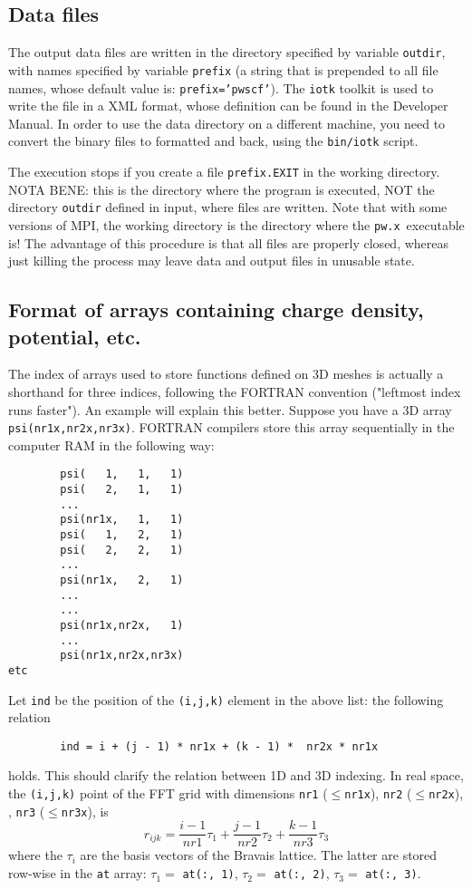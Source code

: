 \documentclass[12pt,a4paper]{article}
\def\pw.x{\texttt{pw.x}}
\begin{document}
\subsection{Data files}

The output data files are written in the directory specified by variable
\texttt{outdir}, with names specified by variable \texttt{prefix} (a string that is prepended
to all file names, whose default value is: \texttt{prefix='pwscf'}). The \texttt{iotk}
toolkit is used to write the file in a XML format, whose definition can
be found in the Developer Manual. In order to use the data directory
on a different machine, you need to convert the binary files to formatted
and back, using the \texttt{bin/iotk} script.

The execution stops if you create a file \texttt{prefix.EXIT} in the working 
directory. NOTA BENE: this is the directory where the program 
is executed, NOT the directory \texttt{outdir} defined in input, where files 
are written. Note that with some versions of MPI, the working directory 
is the directory where the \pw.x\ executable is! The advantage of this 
procedure is that all files are properly closed, whereas  just killing 
the process may leave data and output files in unusable state.

\subsection{Format of arrays containing charge density, potential, etc.}

The index of arrays used to store functions defined on 3D meshes is
actually a shorthand for three indices, following the FORTRAN convention 
("leftmost index runs faster"). An example will explain this better. 
Suppose you have a 3D array \texttt{psi(nr1x,nr2x,nr3x)}. FORTRAN 
compilers store this array sequentially  in the computer RAM in the following way:
\begin{verbatim}
        psi(   1,   1,   1)
        psi(   2,   1,   1)
        ...
        psi(nr1x,   1,   1)
        psi(   1,   2,   1)
        psi(   2,   2,   1)
        ...
        psi(nr1x,   2,   1)
        ...
        ...
        psi(nr1x,nr2x,   1)
        ...
        psi(nr1x,nr2x,nr3x)
etc
\end{verbatim}
Let \texttt{ind} be the position of the \texttt{(i,j,k)} element in the above list: 
the following relation
\begin{verbatim}
        ind = i + (j - 1) * nr1x + (k - 1) *  nr2x * nr1x
\end{verbatim}
holds. This should clarify the relation between 1D and 3D indexing. In real
space, the \texttt{(i,j,k)} point of the FFT grid with dimensions 
\texttt{nr1} ($\le$\texttt{nr1x}), 
\texttt{nr2}  ($\le$\texttt{nr2x}), , \texttt{nr3} ($\le$\texttt{nr3x}), is
$$
r_{ijk}=\frac{i-1}{nr1} \tau_1  +  \frac{j-1}{nr2} \tau_2 +
\frac{k-1}{nr3} \tau_3 
$$
where the $\tau_i$ are the basis vectors of the Bravais lattice. 
The latter are stored row-wise in the \texttt{at} array:
$\tau_1 = $ \texttt{at(:, 1)}, 
$\tau_2 = $ \texttt{at(:, 2)}, 
$\tau_3 = $ \texttt{at(:, 3)}.
\end{document}
